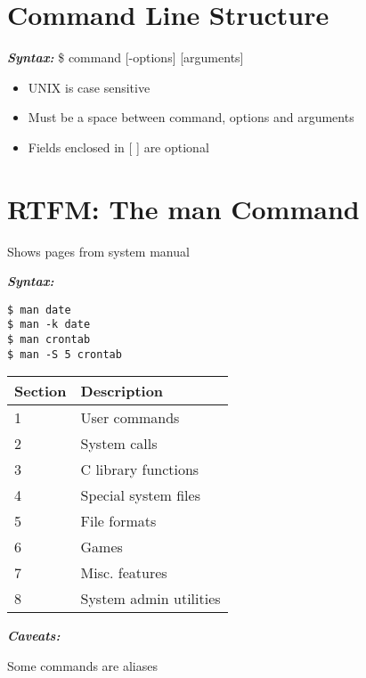 \documentclass{report}
\begin{document}
\section{Command Line Structure}
\bigbreak \noindent
\textbf{\textit{Syntax:}}
\$ command [-options] [arguments]
\begin{itemize}
  \item UNIX is case sensitive
  \item Must be a space between command, options and arguments
  \item Fields enclosed in [ ] are optional
\end{itemize}
\newpage
\section{RTFM: The man Command}
  Shows pages from system manual 
\bigbreak \noindent
\begin{minipage}{0.5\textwidth}
\textbf{\textit{Syntax:}}
\begin{verbatim}
$ man date
$ man -k date
$ man crontab
$ man -S 5 crontab
\end{verbatim}
\end{minipage}
\begin{table}[h!]
  \centering
\begin{tabular}{|m{2cm}|m{6cm}|}
\hline
\textbf{Section} & \textbf{Description} \\ \hline
1                & User commands        \\ \hline
2                & System calls         \\ \hline
3                & C library functions  \\ \hline
4                & Special system files \\ \hline
5                & File formats         \\ \hline
6                & Games                \\ \hline
7                & Misc. features       \\ \hline
8                & System admin utilities \\ \hline
\end{tabular}
\end{table}
\bigbreak \noindent
\textit{\textbf{Caveats:}} \vspace{1.5mm}

\noindent Some commands are aliases \vspace{1.5mm}
\end{document}
